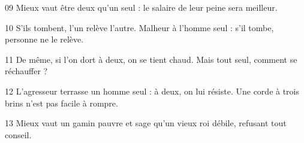 
09 Mieux vaut être deux qu’un seul : le salaire de leur peine sera meilleur.

10 S’ils tombent, l’un relève l’autre. Malheur à l’homme seul : s’il tombe, personne ne le relève.

11 De même, si l’on dort à deux, on se tient chaud. Mais tout seul, comment se réchauffer ?

12 L’agresseur terrasse un homme seul : à deux, on lui résiste. Une corde à trois brins n’est pas facile à rompre.

13 Mieux vaut un gamin pauvre et sage qu’un vieux roi débile, refusant tout conseil.